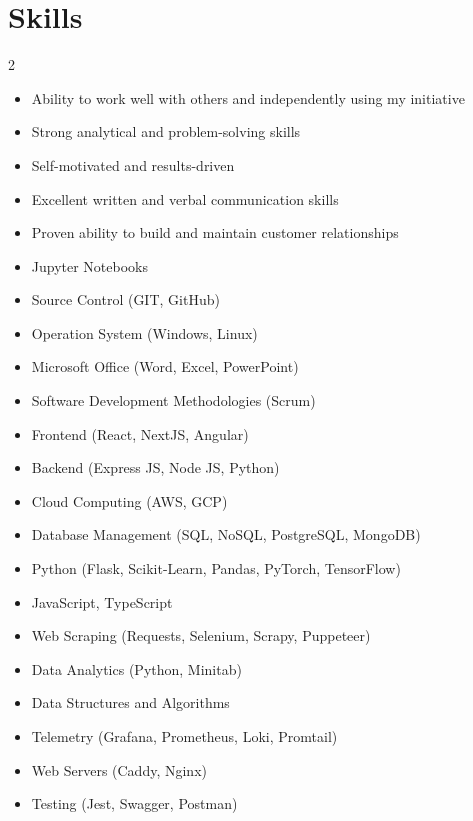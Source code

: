 \documentclass[a4paper,10pt]{article}
\begin{document}
\section*{Skills}
\begin{multicols}{2}
\begin{itemize}[leftmargin=*]
    \item Ability to work well with others and independently using my initiative
    \item Strong analytical and problem-solving skills
    \item Self-motivated and results-driven
    \item Excellent written and verbal communication skills
    \item Proven ability to build and maintain customer relationships
    \item Jupyter Notebooks
    \item Source Control (GIT, GitHub)
    \item Operation System (Windows, Linux)
    \item Microsoft Office (Word, Excel, PowerPoint)
    \item Software Development Methodologies (Scrum)
    \item Frontend (React, NextJS, Angular)
\end{itemize}

\columnbreak

\begin{itemize}[leftmargin=*]
    \item Backend (Express JS, Node JS, Python)
    \item Cloud Computing (AWS, GCP)
    \item Database Management (SQL, NoSQL, PostgreSQL, MongoDB)
    \item Python (Flask, Scikit-Learn, Pandas, PyTorch, TensorFlow)
    \item JavaScript, TypeScript
    \item Web Scraping (Requests, Selenium, Scrapy, Puppeteer)
    \item Data Analytics (Python, Minitab)
    \item Data Structures and Algorithms
    \item Telemetry (Grafana, Prometheus, Loki, Promtail)
    \item Web Servers (Caddy, Nginx)
    \item Testing (Jest, Swagger, Postman)
\end{itemize}
\end{multicols}
\end{document}
